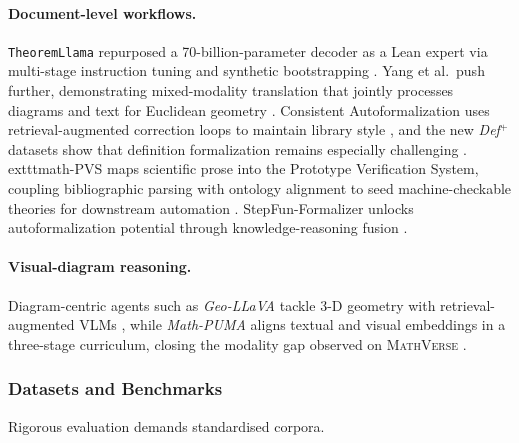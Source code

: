 \documentclass[acmsmall,anonymous]{acmart}
\begin{document}
\paragraph{Document-level workflows.}
\texttt{TheoremLlama} repurposed a 70-billion-parameter decoder as a Lean expert via multi-stage instruction tuning and synthetic bootstrapping \cite{gu2024theoremllama}.  Yang et al.\ push further, demonstrating mixed-modality translation that jointly processes diagrams and text for Euclidean geometry \cite{wu2022autoformalization,murphy2024autoformalizing}. Consistent Autoformalization uses retrieval-augmented correction loops to maintain library style \cite{zhang2024consistentautoformal}, and the new \textit{Def$^{+}$} datasets show that definition formalization remains especially challenging \cite{zhang2025definitions}. 	exttt{math-PVS} maps scientific prose into the Prototype Verification System, coupling bibliographic parsing with ontology alignment to seed machine-checkable theories for downstream automation \cite{saidi-2023-mathpvs}. StepFun-Formalizer unlocks autoformalization potential through knowledge-reasoning fusion \cite{wu2025stepfunformalizer}.

\paragraph{Visual-diagram reasoning.} Diagram-centric agents such as \emph{Geo-LLaVA} tackle 3-D geometry with retrieval-augmented VLMs \cite{gao2024geollava}, while \emph{Math-PUMA} aligns textual and visual embeddings in a three-stage curriculum, closing the modality gap observed on \textsc{MathVerse} \cite{zhuang2025mathpuma}.

\subsubsection{Datasets and Benchmarks}\label{sec:datasets}
Rigorous evaluation demands standardised corpora.
\end{document}
